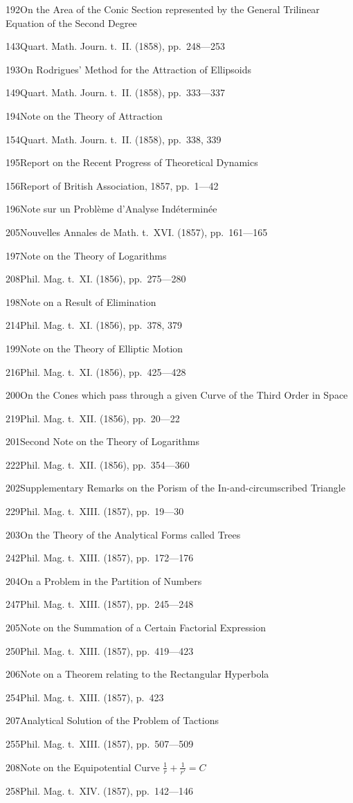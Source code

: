 \documentclass[11pt,a4paper]{book}
\providecommand{\tocentry}[2]{#1\dotfill #2\par}
\begin{document}
\tocentry{192}{On the Area of the Conic Section represented by the General Trilinear Equation of the Second Degree}{143}{Quart. Math. Journ. t.~II. (1858), pp.~248---253}

\tocentry{193}{On Rodrigues' Method for the Attraction of Ellipsoids}{149}{Quart. Math. Journ. t.~II. (1858), pp.~333---337}

\tocentry{194}{Note on the Theory of Attraction}{154}{Quart. Math. Journ. t.~II. (1858), pp.~338, 339}

\tocentry{195}{Report on the Recent Progress of Theoretical Dynamics}{156}{Report of British Association, 1857, pp.~1---42}

\tocentry{196}{Note sur un Probl\`{e}me d'Analyse Ind\'{e}termin\'{e}e}{205}{Nouvelles Annales de Math. t.~XVI. (1857), pp.~161---165}

\tocentry{197}{Note on the Theory of Logarithms}{208}{Phil. Mag. t.~XI. (1856), pp.~275---280}

\tocentry{198}{Note on a Result of Elimination}{214}{Phil. Mag. t.~XI. (1856), pp.~378, 379}

\tocentry{199}{Note on the Theory of Elliptic Motion}{216}{Phil. Mag. t.~XI. (1856), pp.~425---428}

\newpage

\tocentry{200}{On the Cones which pass through a given Curve of the Third Order in Space}{219}{Phil. Mag. t.~XII. (1856), pp.~20---22}

\tocentry{201}{Second Note on the Theory of Logarithms}{222}{Phil. Mag. t.~XII. (1856), pp.~354---360}

\tocentry{202}{Supplementary Remarks on the Porism of the In-and-circumscribed Triangle}{229}{Phil. Mag. t.~XIII. (1857), pp.~19---30}

\tocentry{203}{On the Theory of the Analytical Forms called Trees}{242}{Phil. Mag. t.~XIII. (1857), pp.~172---176}

\tocentry{204}{On a Problem in the Partition of Numbers}{247}{Phil. Mag. t.~XIII. (1857), pp.~245---248}

\tocentry{205}{Note on the Summation of a Certain Factorial Expression}{250}{Phil. Mag. t.~XIII. (1857), pp.~419---423}

\tocentry{206}{Note on a Theorem relating to the Rectangular Hyperbola}{254}{Phil. Mag. t.~XIII. (1857), p.~423}

\tocentry{207}{Analytical Solution of the Problem of Tactions}{255}{Phil. Mag. t.~XIII. (1857), pp.~507---509}

\tocentry{208}{Note on the Equipotential Curve $\frac{1}{r} + \frac{1}{r'} = C$}{258}{Phil. Mag. t.~XIV. (1857), pp.~142---146}
\end{document}
